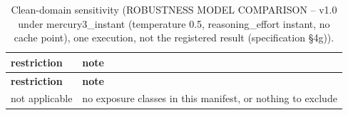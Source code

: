 \begingroup\footnotesize
\begin{longtable}{>{\raggedright\arraybackslash}p{126.4pt}>{\raggedright\arraybackslash}p{304.6pt}}
\caption{Clean-domain sensitivity (ROBUSTNESS MODEL COMPARISON -- v1.0 under mercury3\_\allowbreak{}instant (temperature 0.5, reasoning\_\allowbreak{}effort instant, no cache point), one execution, not the registered result (specification §4g)).} \\
\toprule
\textbf{restriction} & \textbf{note} \\
\midrule
\endfirsthead
\toprule
\textbf{restriction} & \textbf{note} \\
\midrule
\endhead
\bottomrule
\endfoot
not applicable & no exposure classes in this manifest, or nothing to exclude \\
\end{longtable}
\endgroup
